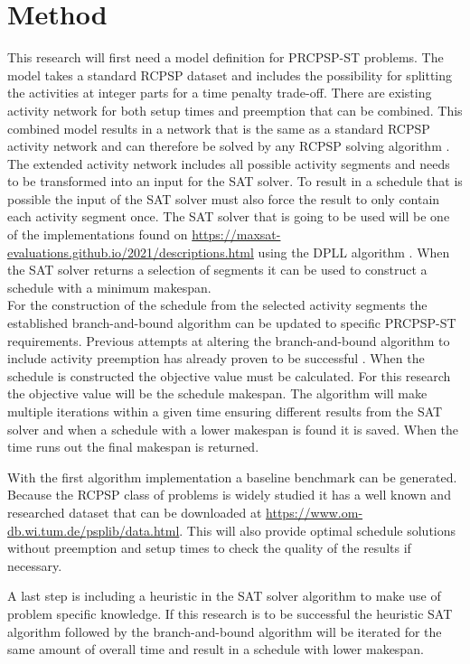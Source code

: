 \documentclass[english]{article}
\begin{document}
\section*{Method}
This research will first need a model definition for PRCPSP-ST problems. The model takes a standard RCPSP dataset and includes the possibility for splitting the activities at integer parts for a time penalty trade-off. There are existing activity network for both setup times \cite{RN13} and preemption \cite{RN21} that can be combined. This combined model results in a network that is the same as a standard RCPSP activity network and can therefore be solved by any RCPSP solving algorithm \cite{RN1}. The extended activity network includes all possible activity segments and needs to be transformed into an input for the SAT solver. To result in a schedule that is possible the input of the SAT solver must also force the result to only contain each activity segment once. The SAT solver that is going to be used will be one of the implementations found on \url{https://maxsat-evaluations.github.io/2021/descriptions.html} using the DPLL algorithm \cite{RN18}\cite{RN16}. When the SAT solver returns a selection of segments it can be used to construct a schedule with a minimum makespan.\\
For the construction of the schedule from the selected activity segments the established branch-and-bound algorithm \cite{RN24} can be updated to specific PRCPSP-ST requirements. Previous attempts at altering the branch-and-bound algorithm to include activity preemption has already proven to be successful \cite{RN23}. When the schedule is constructed the objective value must be calculated. For this research the objective value will be the schedule makespan. The algorithm will make multiple iterations within a given time ensuring different results from the SAT solver and when a schedule with a lower makespan is found it is saved. When the time runs out the final makespan is returned.

With the first algorithm implementation a baseline benchmark can be generated. Because the RCPSP class of problems is widely studied it has a well known and researched dataset \cite{RN25} that can be downloaded at \url{https://www.om-db.wi.tum.de/psplib/data.html}. This will also provide optimal schedule solutions without preemption and setup times to check the quality of the results if necessary.

A last step is including a heuristic in the SAT solver algorithm to make use of problem specific knowledge. If this research is to be successful the heuristic SAT algorithm followed by the branch-and-bound algorithm will be iterated for the same amount of overall time and result in a schedule with lower makespan.
\end{document}
